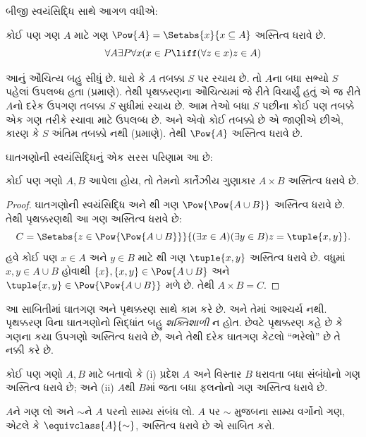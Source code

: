 \documentclass[../../../include/open-logic-section]{subfiles}
\begin{document}

બીજી સ્વયંસિદ્ધિ સાથે આગળ વધીએ:

\begin{axiom}[ઘાતગણો]
કોઈ પણ ગણ $A$ માટે ગણ $\Pow{A} = \Setabs{x}{x \subseteq A}$
અસ્તિત્વ ધરાવે છે.
\[
\forall A \exists P \forall x(x \in P \liff (\forall z \in x)z \in A)
\]
\end{axiom}

આનું ઔચિત્ય બહુ સીધું છે. ધારો કે $A$ તબક્કા $S$ પર રચાય છે.
તો $A$ના બધા સભ્યો $S$ પહેલાં ઉપલબ્ધ હતા (\stagesacc પ્રમાણે).
તેથી પૃથક્કરણના ઔચિત્યમાં જે રીતે વિચાર્યું હતું એ જ રીતે
$A$નો દરેક ઉપગણ તબક્કા $S$ સુધીમાં રચાય છે. આમ તેઓ બધા
$S$ પછીના કોઈ પણ તબક્કે એક ગણ તરીકે રચાવા માટે ઉપલબ્ધ છે.
અને એવો કોઈ તબક્કો છે એ જાણીએ છીએ, કારણ કે $S$ અંતિમ તબક્કો
નથી (\stagessucc પ્રમાણે). તેથી $\Pow{A}$ અસ્તિત્વ ધરાવે છે.

ઘાતગણોની સ્વયંસિદ્ધિનું એક સરસ પરિણામ આ છે:

\begin{prop}\label{thm:Products}
કોઈ પણ ગણો $A, B$ આપેલા હોય, તો તેમનો કાર્તેઝીય ગુણાકાર
$A \times B$ અસ્તિત્વ ધરાવે છે.
\end{prop}

\begin{proof}
ઘાતગણોની સ્વયંસિદ્ધિ અને
થી ગણ
$\Pow{\Pow{A \cup B}}$ અસ્તિત્વ ધરાવે છે. તેથી પૃથક્કરણથી
આ ગણ અસ્તિત્વ ધરાવે છે:
\[
C = \Setabs{z \in \Pow{\Pow{A \cup B}}}{(\exists x \in A)(\exists y \in B) z = \tuple{x, y}}.
\]
હવે કોઈ પણ $x \in A$ અને $y \in B$ માટે
થી ગણ
$\tuple{x, y}$ અસ્તિત્વ ધરાવે છે. વધુમાં $x, y
\in A \cup B$ હોવાથી $\{x\}, \{x, y\} \in \Pow{A \cup B}$
અને $\tuple{x,y} \in \Pow{\Pow{A \cup B}}$ મળે છે.
તેથી $A \times B = C$.
\end{proof}

આ સાબિતીમાં ઘાતગણ અને પૃથક્કરણ સાથે કામ કરે છે. અને તેમાં
આશ્ચર્ય નથી. પૃથક્કરણ વિના ઘાતગણોનો સિદ્ધાંત બહુ
\emph{શક્તિશાળી} ન હોત. છેવટે પૃથક્કરણ કહે છે કે ગણના કયા
ઉપગણો અસ્તિત્વ ધરાવે છે, અને તેથી દરેક ઘાતગણ કેટલો ``ભરેલો''
છે તે નક્કી કરે છે.

\begin{prob}
કોઈ પણ ગણો $A, B$ માટે બતાવો કે (i) પ્રદેશ $A$ અને વિસ્તાર
$B$ ધરાવતા બધા સંબંધોનો ગણ અસ્તિત્વ ધરાવે છે; અને
(ii) $A$થી $B$માં જતા બધા ફલનોનો ગણ અસ્તિત્વ ધરાવે છે.
\end{prob}

\begin{prob}
$A$ને ગણ લો અને $\sim$ને $A$ પરનો સામ્ય સંબંધ લો.
$A$ પર $\sim$ મુજબના સામ્ય વર્ગોનો ગણ, એટલે કે
$\equivclass{A}{\sim}$, અસ્તિત્વ ધરાવે છે એ સાબિત કરો.
\end{prob}
\end{document}

